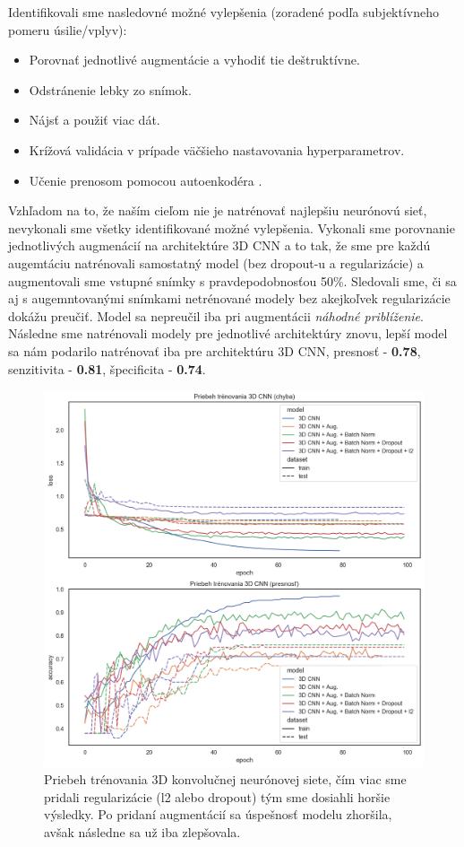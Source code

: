 Identifikovali sme nasledovné možné vylepšenia (zoradené podľa subjektívneho pomeru úsilie/vplyv):
\begin{itemize}
    \item Porovnať jednotlivé augmentácie a vyhodiť tie deštruktívne.
    \item Odstránenie lebky zo snímok.
    \item Nájsť a použiť viac dát.
    \item Krížová validácia v prípade väčšieho nastavovania hyperparametrov.
    \item Učenie prenosom pomocou autoenkodéra \cite{hosseini2016alzheimer}.
\end{itemize}

Vzhľadom na to, že naším cieľom nie je natrénovať najlepšiu neurónovú sieť, nevykonali sme všetky identifikované možné vylepšenia. Vykonali sme porovnanie jednotlivých augmenácií na architektúre 3D CNN a to tak, že sme pre každú augemtáciu natrénovali samostatný model (bez dropout-u a regularizácie) a augmentovali sme vstupné snímky s pravdepodobnosťou 50\%. Sledovali sme, či sa aj s augemntovanými snímkami netrénované modely bez akejkoľvek regularizácie dokážu preučiť. Model sa nepreučil iba pri augmentácii \textit{náhodné priblíženie}. Následne sme natrénovali modely pre jednotlivé architektúry znovu, lepší model sa nám podarilo natrénovať iba pre architektúru 3D CNN, presnosť - \textbf{0.78}, senzitivita - \textbf{0.81}, špecificita - \textbf{0.74}.

\begin{figure}[h!]
    \centering
    \includegraphics[width=14cm]{assets/images/3d_cnn_training.png}
    \caption{Priebeh trénovania 3D konvolučnej neurónovej siete, čím viac sme pridali regularizácie (l2 alebo dropout) tým sme dosiahli horšie výsledky. Po pridaní augmentácií sa úspešnosť modelu zhoršila, avšak následne sa už iba zlepšovala.}
    \label{fig:3d_cnn_training}
\end{figure}

